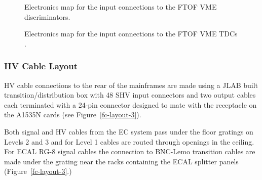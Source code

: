 \documentclass[letterpaper,10pt]{article}
\begin{document}
\begin{figure}[htbp]
\vspace{20.0cm}
\caption{Electronics map for the input connections to the FTOF VME discriminators.}
\label{ftof-disc-map}
\end{figure}

\begin{figure}[htbp]
\vspace{20.0cm}
 
\caption{Electronics map for the input connections to the FTOF VME TDCs .}
\label{ftof-tdc-map}
\end{figure}


\subsubsection{HV Cable Layout}
\label{hv-layout}

HV cable connections to the rear of the mainframes are made using a JLAB built transition/distribution box with 48 SHV input connectors and two output cables each terminated with a 24-pin connector designed to mate with the receptacle on the A1535N cards (see Figure~\ref{fc-layout-3}).

Both signal and HV cables from the EC system pass under the floor gratings on Levels 2 and 3 and for Level 1
cables are routed through openings in the ceiling.  For ECAL RG-8 signal cables the connection to BNC-Lemo transition cables
are made under the grating near the racks containing the ECAL splitter panels (Figure~\ref{fc-layout-3}.)
\end{document}
